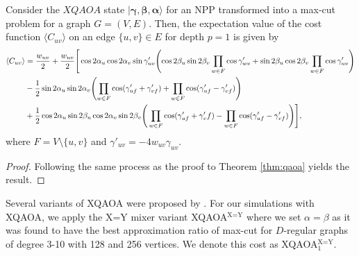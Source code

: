     \begin{widetext}
    \begin{theorem} \label{thm:xqaoa}
        Consider the $XQAOA$ state $|\pmb{\gamma},\pmb{\beta},\pmb{\alpha}\rangle$ for an NPP transformed into a max-cut problem for a graph $G=(V,E)$. Then, the expectation value of the cost function $\langle C_{uv}\rangle$ on an edge $\{u,v\}\in E$ for depth $p=1$ is given by
        \begin{align*}
            \begin{split}
            \langle C_{uv}\rangle &= \frac{w_{uv}}{2}+\frac{w_{uv}}{2}\Bigg[\cos2\alpha_u\cos2\alpha_v\sin\gamma'_{uv}\lr(){\cos2\beta_u\sin2\beta_v\prod_{w\in F}\cos\gamma'_{wv}+\sin2\beta_u\cos2\beta_v\prod_{w\in F}\cos\gamma'_{uv}}   \\
             &-\frac{1}{2}\sin2\alpha_u\sin2\alpha_v\lr(){\prod_{w\in F} \cos(\gamma'_{uf}+\gamma'_{vf})+\prod_{w\in F}\cos(\gamma'_{uf}-\gamma'_{vf})} \\
             & +\frac{1}{2}\cos2\alpha_u\sin2\beta_u\cos2\alpha_v\sin2\beta_v\Bigg(\prod_{w\in F}\cos(\gamma'_{uf}+\gamma'_vf)-\prod_{w\in F}\cos(\gamma'_{uf}-\gamma'_{vf})\Bigg)\Bigg],
            \end{split}
        \end{align*}
        where $F=V \setminus \{u,v\}$ and $\gamma'_{uv} = -4w_{uv}\gamma_{uv}$.
    \end{theorem}
    \end{widetext}
    \begin{proof}
        Following the same process as the proof to Theorem \ref{thm:qaoa} yields the result.
    \end{proof}

    Several variants of XQAOA were proposed by \citet{vijendran2023expressive}. For our simulations with XQAOA, we apply the X=Y mixer variant XQAOA$^{\text{X=Y}}$ where we set $\alpha=\beta$ as it was found to have the best approximation ratio of max-cut for $D$-regular graphs of degree 3-10 with 128 and 256 vertices. We denote this cost as XQAOA$_1^\text{X=Y}$.
